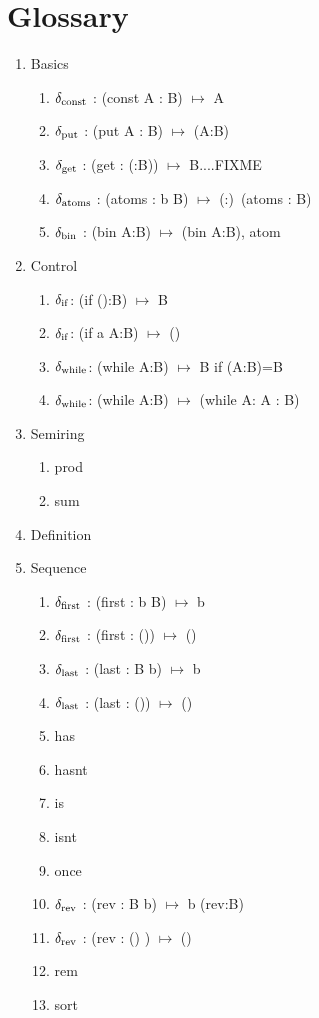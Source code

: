 \documentclass[11pt]{article}
\begin{document}
\section{Glossary}

\begin{enumerate}
\item {Basics
\begin{enumerate}
\item{$\delta_{\rm const}$ : (const A : B) $\mapsto$ A}
\item{$\delta_{\rm put}$ : (put A : B) $\mapsto$ (A:B)} 
\item{$\delta_{\rm get}$ : (get : (:B)) $\mapsto$ B....FIXME}
\item{$\delta_{\rm atoms}$ : (atoms : b B) $\mapsto$ (:)\ (atoms : B)}
\item{$\delta_{\rm bin}$ : (bin A:B) $\mapsto$ (bin A:B), atom} 
\end{enumerate}
}
\item {Control
\begin{enumerate}
\item{$\delta_{\rm if}$: (if ():B) $\mapsto$ B }
\item{$\delta_{\rm if}$: (if a A:B) $\mapsto$ () }
\item{$\delta_{\rm while}$: (while A:B) $\mapsto$ B if (A:B)=B }
\item{$\delta_{\rm while}$: (while A:B) $\mapsto$ (while A: A : B) }
\end{enumerate}
}
\item{Semiring
\begin{enumerate}
\item{prod}
\item{sum}
\end{enumerate}
}
\item{Definition}
\item{Sequence 
\begin{enumerate}
\item{$\delta_{\rm first}$ : (first : b B) $\mapsto$ b}
\item{$\delta_{\rm first}$ : (first : ()) $\mapsto$ ()} 
\item{$\delta_{\rm last}$ : (last : B b) $\mapsto$ b} 
\item{$\delta_{\rm last}$ : (last : ()) $\mapsto$ ()} 
\item{has}
\item{hasnt}
\item{is}
\item{isnt} 
\item{once} 
\item{$\delta_{\rm rev}$ : (rev : B b) $\mapsto$ b (rev:B)} 
\item{$\delta_{\rm rev}$ : (rev : () ) $\mapsto$ ()}
\item{rem} 
\item{sort} 
\end{enumerate} 
}
\end{enumerate}
\end{document}

